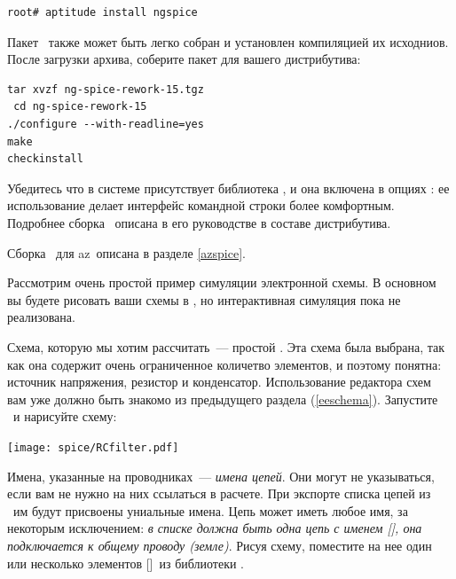 





\begin{verbatim}
root# aptitude install ngspice
\end{verbatim}

Пакет \pack{\ngs}\ также может быть легко собран и установлен компиляцией
их исходниов. После загрузки архива, соберите пакет для вашего дистрибутива:
\begin{verbatim}
tar xvzf ng-spice-rework-15.tgz
 cd ng-spice-rework-15
./configure --with-readline=yes
make
checkinstall
\end{verbatim}

Убедитесь что в системе присутствует библиотека , и она
включена в опциях : ее использование делает интерфейс командной
строки более комфортным. Подробнее сборка \ngs\ описана в его руководстве в
составе дистрибутива.

\bigskip
Сборка \ngs\ для az\linux\ описана в разделе \ref{azspice}.


Рассмотрим очень простой пример симуляции электронной схемы. В основном вы
будете рисовать ваши схемы в \eeschema, но интерактивная симуляция пока не
реализована.

\secdown


Схема, которую мы хотим рассчитать\ --- простой . Эта схема была
выбрана, так как она содержит очень ограниченное количетво элементов, и поэтому
понятна: источник напряжения, резистор и конденсатор. Использование редактора
схем вам уже должно быть знакомо из предыдущего раздела (\ref{eeschema}).
Запустите \eeschema\ и нарисуйте схему:

\bigskip
\texttt{[image: spice/RCfilter.pdf]}
\bigskip

Имена, указанные на проводниках\ --- \emph{имена цепей}. Они могут не
указываться, если вам не нужно на них ссылаться в расчете. При экспорте списка
цепей из \eeschema\ им будут присвоены униальные имена. Цепь может иметь любое
имя, за некоторым исключением: \emph{в списке должна быть одна цепь с именем
[], она подключается к общему проводу (земле)}. Рисуя схему, поместите
на нее один или несколько элементов []\ из библиотеки .

